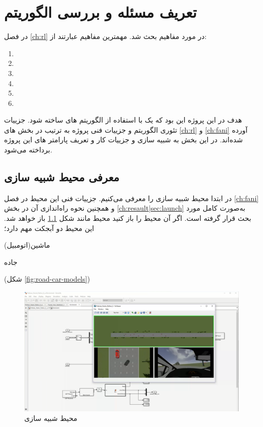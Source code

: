 \chapter{تعریف مسئله و بررسی الگوریتم}\label{ch:alg}

در فصل \ref{ch:rl} در مورد مفاهیم  بحث شد. مهمترین مفاهیم عبارتند از:
\begin{multicols}{3}
\begin{enumerate}
	\item {} \item {} \item {} \item {} \item {} \item {} 
\end{enumerate}
\end{multicols}

هدف در این پروژه این بود که یک  با استفاده از الگوریتم های  ساخته شود. جزییات تئوری الگوریتم و جزییات فنی پروژه به ترتیب در بخش های 
\ref{ch:rl}
و
\ref{ch:fani}
آورده شده‌اند.
در این بخش به شبیه سازی و جزییات کار و تعریف پارامتر های این پروژه برداخته می‌شود.

\section{معرفی محیط شبیه سازی}

در ابتدا محیط شبیه سازی را معرفی می‌کنیم. جزییات فنی این محیط در فصل \ref{ch:fani} و همچنین نحوه راه‌اندازی آن در بخش \ref{ch:resault|sec:launch} به‌صورت کامل مورد بحث قرار گرفته است. اگر آن محیط را باز کنید محیط مانند شکل 
\ref{fig:obs-1}
باز خواهد شد. این محیط دو آبجکت مهم دارد؛
\begin{alphinline}
	\item ماشین(اتومبیل)
	\item جاده
\end{alphinline}
(شکل \ref{fig:road-car-models}) 



\begin{figure}
	\centering
	\includegraphics[width=0.7\linewidth]{Figures/OBS/1}
	\caption{محیط شبیه سازی}
	\label{fig:obs-1}
\end{figure}



